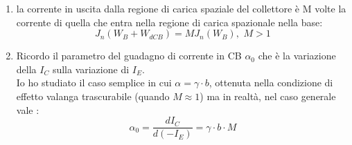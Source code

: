\begin{enumerate}
    \item la corrente in uscita dalla regione di carica spaziale del collettore è M volte la corrente di quella che entra nella regione di carica spazionale nella base:
    \begin{equation}
        J_n(W_B + W_{dCB}) = M J_n(W_B) \text{, } \, M>1
    \end{equation}
    
    \item Ricordo il parametro del guadagno di corrente in CB $\alpha_0$ che è la variazione della $I_C$ sulla variazione di $I_E$.\\
    Io ho studiato il caso semplice in cui $\alpha=\gamma \cdot b$, ottenuta nella condizione di effetto valanga trascurabile (quando $M \approx 1$) ma in realtà, nel caso generale vale :
    \begin{equation}
        \alpha_0=\dfrac{dI_C}{d(-I_E)}=\gamma \cdot b \cdot M
    \end{equation} 
\end{enumerate}
%

